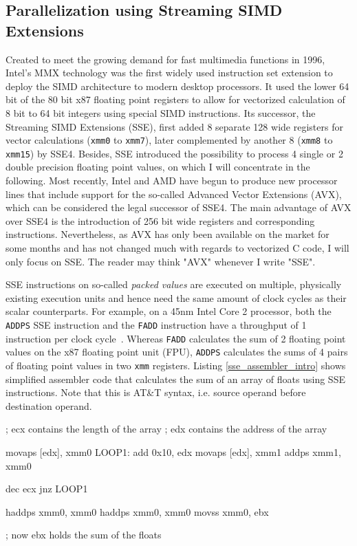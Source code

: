 \subsection{Parallelization using Streaming SIMD Extensions}
Created to meet the growing demand for fast multimedia functions in 1996, Intel's MMX technology was the first widely used instruction set extension to deploy the SIMD architecture to modern desktop processors. It used the lower 64 bit of the 80 bit x87 floating point registers to allow for vectorized calculation of 8 bit to 64 bit integers using special SIMD instructions. Its successor, the Streaming SIMD Extensions (SSE), first added 8 separate 128 wide registers for vector calculations (\texttt{xmm0} to \texttt{xmm7}), later complemented by another 8 (\texttt{xmm8} to \texttt{xmm15}) by SSE4. Besides, SSE introduced the possibility to process 4 single or 2 double precision floating point values, on which I will concentrate in the following. Most recently, Intel and AMD have begun to produce new processor lines that include support for the so-called Advanced Vector Extensions (AVX), which can be considered the legal successor of SSE4. The main advantage of AVX over SSE4 is the introduction of 256 bit wide registers and corresponding instructions. Nevertheless, as AVX has only been available on the market for some months and has not changed much with regards to vectorized C code, I will only focus on SSE. The reader may think "AVX" whenever I write "SSE".

SSE instructions on so-called \emph{packed values} are executed on multiple, physically existing execution units and hence need the same amount of clock cycles as their scalar counterparts. For example, on a 45nm Intel Core 2 processor, both the \texttt{ADDPS} SSE instruction and the \texttt{FADD} instruction have a throughput of 1 instruction per clock cycle~\cite[pp. 50, 57]{fog2011instructiontables}. Whereas \texttt{FADD} calculates the sum of 2 floating point values on the x87 floating point unit (FPU), \texttt{ADDPS} calculates the sums of 4 pairs of floating point values in two \texttt{xmm} registers. Listing \ref{sse_assembler_intro} shows simplified assembler code that calculates the sum of an array of floats using SSE instructions. Note that this is AT\&T syntax, i.e. source operand before destination operand.
\begin{assembler}[caption={Array sum using simplified SSE assembly}, label=sse_assembler_intro]
  ; ecx contains the length of the array
  ; edx contains the address of the array

  movaps [edx], xmm0
LOOP1:
  add    0x10, edx
  movaps [edx], xmm1
  addps  xmm1, xmm0

  dec    ecx
  jnz    LOOP1

  haddps xmm0, xmm0
  haddps xmm0, xmm0
  movss  xmm0, ebx

  ; now ebx holds the sum of the floats
\end{assembler}

